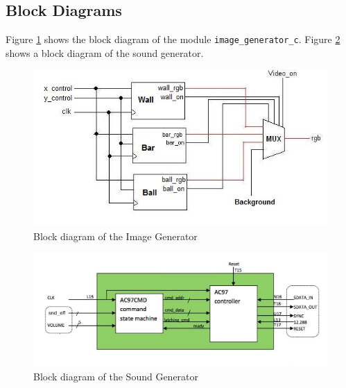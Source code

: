 	\subsection{Block Diagrams}
		Figure \ref{img_gen} shows the block diagram of the module \texttt{image\_generator\_c}. Figure \ref{snd_gen} shows a block diagram of the sound generator. 
		
	\begin{figure}[here]
		\centering
		\includegraphics[scale=0.7]{images/img_gen.jpg}
		\caption{Block diagram of the Image Generator}
		\label{img_gen}
	\end{figure}
	
	\begin{figure}[here]
		\centering
		\includegraphics[scale=0.5]{images/snd_gen.png}
		\caption{Block diagram of the Sound Generator}
		\label{snd_gen}
	\end{figure}
		
		
